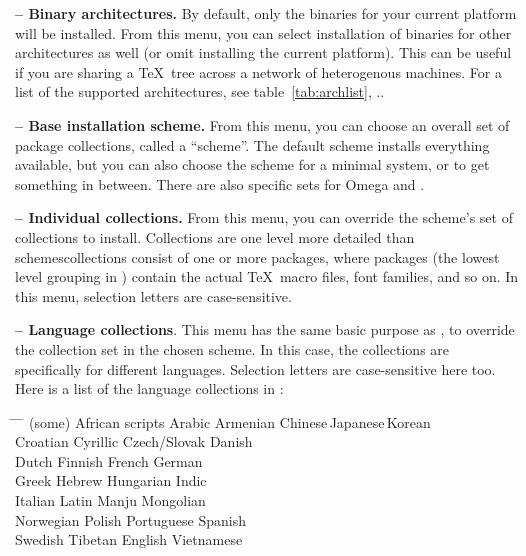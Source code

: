 \documentclass{article}
\begin{document}
\textbf{ -- Binary architectures.}  By default, only the
binaries for your current platform will be installed.  From this menu,
you can select installation of binaries for other architectures as well
(or omit installing the current platform).  This can be useful if you are
sharing a \TeX\ tree across a network of heterogenous machines.  For a
list of the supported architectures, see table~\ref{tab:archlist},
\p.\pageref{tab:archlist}.

\textbf{ -- Base installation scheme.}  From this menu, you
can choose an overall set of package collections, called a ``scheme''.
The default  scheme installs everything available, but you
can also choose the  scheme for a minimal system, or
 to get something in between.  There are also specific
sets for Omega and .

\textbf{ -- Individual collections.}  From this menu, you can
override the scheme's set of collections to install.  Collections are
one level more detailed than schemes\Dash collections consist of one or
more packages, where packages (the lowest level grouping in \TL) contain
the actual \TeX\ macro files, font families, and so on.  In this menu,
selection letters are case-sensitive.

\textbf{ -- Language collections}.  This menu has the same
basic purpose as , to override the collection set in the chosen
scheme.  In this case, the collections are specifically for different
languages.  Selection letters are case-sensitive here too.  Here is a
list of the language collections in \TL:

\begin{tabbing}
\hspace{.25\linewidth} \=
\hspace{.25\linewidth} \=
\hspace{.25\linewidth} \=
\hspace{.25\linewidth} \kill
(some) African scripts \>
Arabic \>
Armenian \>
Chinese\,Japanese\,Korean \\
Croatian \>
Cyrillic \>
Czech/Slovak \>
Danish \\
Dutch \>
Finnish \>
French \>
German \\
Greek \>
Hebrew \>
Hungarian \>
Indic \\
Italian \>
Latin \>
Manju \>
Mongolian \\
Norwegian \>
Polish \>
Portuguese \>
Spanish \\
Swedish \>
Tibetan \>
 English \>
Vietnamese \\
\end{tabbing}
\end{document}
